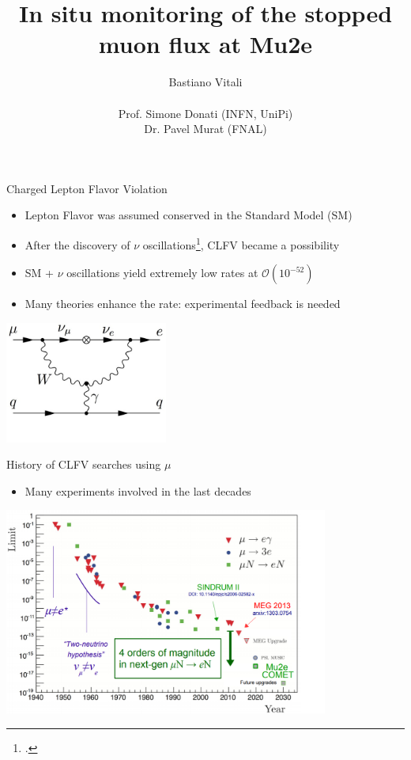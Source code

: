 \documentclass[10pt]{beamer}
\author[Bastiano Vitali]{{\Large Bastiano Vitali}\\\ \\{\small Prof. Simone Donati (INFN, UniPi)\\ Dr. Pavel Murat (FNAL)}}
\title{In situ monitoring of the stopped muon flux at Mu2e}
\date{}
\begin{document}
\begin{frame}
\titlepage
\end{frame}

\begin{frame}{Charged Lepton Flavor Violation}
\vspace{0.3cm}
\begin{itemize}
\setlength\itemsep{0.3cm}
\item Lepton Flavor was assumed conserved in the Standard Model (SM)
\item After the discovery of $\nu$ oscillations\footcite{oscillations}, CLFV became a possibility
\item SM + $\nu$ oscillations yield extremely low rates at $\mathcal{O}(10^{-52})$ %
\item Many theories enhance the rate: experimental feedback is needed
\end{itemize}
\vspace{0.5cm}
\begin{center}
\includegraphics[width=0.4\textwidth]{feynman_mu2e}
\end{center}
\end{frame}

\begin{frame}{History of CLFV searches using $\mu$}
\begin{itemize}
\item Many experiments involved in the last decades
\end{itemize}
\begin{center}
\includegraphics[width=0.8\textwidth]{timeline_measures_3PS}
\end{center}
\end{frame}
\end{document}
